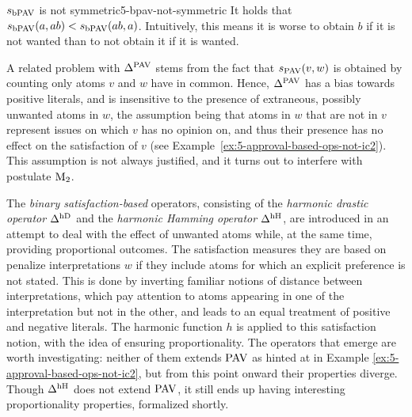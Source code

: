 \begin{xmpl}{$s_{\mathrm{bPAV}}$ is not symmetric}{5-bpav-not-symmetric}
	It holds that $s_{\mathrm{bPAV}}(a,ab)<s_{\mathrm{bPAV}}(ab,a)$.
	Intuitively, this means it is worse to obtain $b$ if it is not wanted
	than to not obtain it if it is wanted.
\end{xmpl}
 
A related problem with $\Delta^{\mathrm{PAV}}$ stems from the fact that
$s_{\mathrm{PAV}}(v,w)$ is obtained by counting
only atoms $v$ and $w$ have in common.
Hence, $\Delta^{\mathrm{PAV}}$ has a bias towards positive literals,
and is insensitive to the presence of extraneous, possibly unwanted atoms in $w$,
the assumption being that atoms in $w$ that are not in $v$ represent issues
on which $v$ has no opinion on, and thus their presence has no effect on the satisfaction of $v$
(see Example~\ref{ex:5-approval-based-ops-not-ic2}).
This assumption is not always justified,
and it turns out to interfere with postulate $\mathrm{M}_{2}$.

The \emph{binary satisfaction-based} operators,
consisting of the \emph{harmonic drastic operator $\Delta^{\mathrm{hD}}$}
and the \emph{harmonic Hamming operator $\Delta^{\mathrm{hH}}{}$},
are introduced in an attempt to deal with the effect of unwanted atoms
while, at the same time, providing proportional outcomes.
The satisfaction measures they are based on 
penalize interpretations $w$ if they include atoms for which an explicit preference is not stated.
This is done by inverting familiar notions of distance between interpretations, 
which pay attention to atoms appearing in one of the interpretation but not in the other,
and leads to an equal treatment of positive and negative literals.
The harmonic function $h$ is applied to this satisfaction notion, 
with the idea of ensuring proportionality.
The operators that emerge are worth investigating:
neither of them extends $\mathrm{PAV}$ 
as hinted at in Example \ref{ex:5-approval-based-ops-not-ic2},
but from this point onward their properties diverge.
Though $\Delta^{\mathrm{hH}}$ does not extend $\mathrm{PAV}$, 
it still ends up having interesting 
proportionality properties, formalized shortly.


